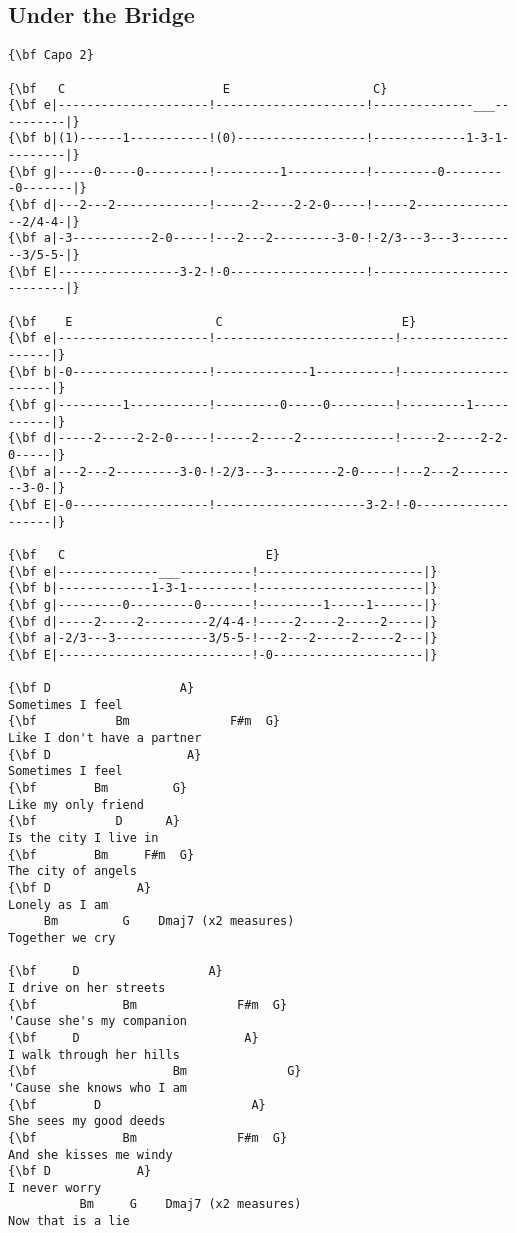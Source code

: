 \documentclass[a4paper]{article}
\begin{document}
\subsection{Under the Bridge} %
\label{sub:Under the Bridge}
\begin{Verbatim}[commandchars=\\\{\}]
{\bf Capo 2}

{\bf   C                      E                    C}
{\bf e|---------------------!---------------------!--------------___----------|}
{\bf b|(1)------1-----------!(0)------------------!-------------1-3-1---------|}
{\bf g|-----0-----0---------!---------1-----------!---------0---------0-------|}
{\bf d|---2---2-------------!-----2-----2-2-0-----!-----2---------------2/4-4-|}
{\bf a|-3-----------2-0-----!---2---2---------3-0-!-2/3---3---3---------3/5-5-|}
{\bf E|-----------------3-2-!-0-------------------!---------------------------|}

{\bf    E                    C                         E}
{\bf e|---------------------!-------------------------!---------------------|}
{\bf b|-0-------------------!-------------1-----------!---------------------|}
{\bf g|---------1-----------!---------0-----0---------!---------1-----------|}
{\bf d|-----2-----2-2-0-----!-----2-----2-------------!-----2-----2-2-0-----|}
{\bf a|---2---2---------3-0-!-2/3---3---------2-0-----!---2---2---------3-0-|}
{\bf E|-0-------------------!---------------------3-2-!-0-------------------|}

{\bf   C                            E}
{\bf e|--------------___----------!-----------------------|}
{\bf b|-------------1-3-1---------!-----------------------|}
{\bf g|---------0---------0-------!---------1-----1-------|}
{\bf d|-----2-----2---------2/4-4-!-----2-----2-----2-----|}
{\bf a|-2/3---3-------------3/5-5-!---2---2-----2-----2---|}
{\bf E|---------------------------!-0---------------------|}

{\bf D                  A}
Sometimes I feel
{\bf           Bm              F#m  G}
Like I don't have a partner
{\bf D                   A}
Sometimes I feel
{\bf        Bm         G}
Like my only friend
{\bf           D      A}
Is the city I live in
{\bf        Bm     F#m  G}
The city of angels
{\bf D            A}
Lonely as I am
     Bm         G    Dmaj7 (x2 measures)
Together we cry

{\bf     D                  A}
I drive on her streets
{\bf            Bm              F#m  G}
'Cause she's my companion
{\bf     D                       A}
I walk through her hills
{\bf                   Bm              G}
'Cause she knows who I am
{\bf        D                     A}
She sees my good deeds
{\bf            Bm              F#m  G}
And she kisses me windy
{\bf D            A}
I never worry
          Bm     G    Dmaj7 (x2 measures)
Now that is a lie


\end{Verbatim}
\end{document}
